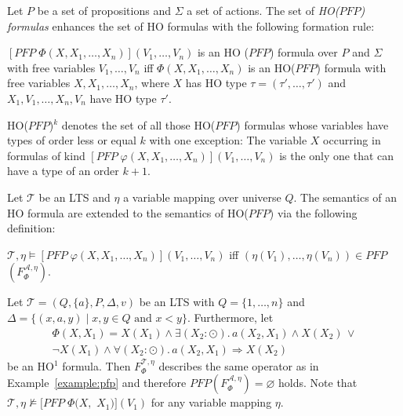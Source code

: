 \begin{definition}
    Let $P$ be a set of propositions and $\Sigma$ a set of actions. The set of \emph{HO($\mathit{PFP}$) formulas} enhances the set of HO formulas with the
    following formation rule:
    \begin{compactitem}
        \item $[\mathit{PFP}\;\Phi(X, X_1, \dots, X_n)](V_1, \dots, V_n)$ is an HO
        ($\mathit{PFP}$) formula over $P$ and $\Sigma$ with free variables $V_1, \dots, V_n$ iff $\Phi(X, X_1, \dots, X_n)
        $ is an HO($\mathit{PFP}$) formula with free variables $X, X_1, \dots, X_n$, where $X$ has HO type $\tau =
        (\tau', \dots, \tau')$ and $X_1, V_1, \dots, X_n, V_n$ have HO type $\tau'$.
    \end{compactitem}
\end{definition}

HO($\mathit{PFP}$)$^k$ denotes the set of all those HO($\mathit{PFP}$) formulas whose variables have types of
order less or equal $k$ with one exception: The variable $X$ occurring in formulas of kind $[\mathit{PFP}\;\varphi(X, X_1, \dots, X_n)](V_1, \dots, V_n)$ is the only one that can have a type of an order $k+1$.

\begin{definition}
    Let $\mathcal{T}$ be an LTS and $\eta$ a variable mapping over universe $Q$. The
    semantics of an HO formula are extended to the semantics of HO($\mathit{PFP}$) via the following definition:
    \begin{compactitem}
        \item $\mathcal{T}, \eta \models [\mathit{PFP}\;\varphi(X, X_1, \dots, X_n)](V_1, \dots,
        V_n)$ iff $(\eta(V_1), \dots, \eta(V_n)) \in \mathit{PFP}$ $(F_\Phi^{\mathcal{A},\eta})$.
    \end{compactitem}
\end{definition}

\begin{example}
\label{example:ho_pfp}
Let $\mathcal{T} = (Q, \{a\}, P, \Delta, v)$ be an LTS with $Q = \{1, \dots, n\}$ and $\Delta = \{(x, a, y) \mid x, y \in Q \text{ and } x < y\}$. Furthermore, let
\begin{align*}
	\Phi(X,X_1) = X(X_1) \wedge \exists (X_2 \colon \odot).\, a(X_2, X_1) \wedge X(X_2)\,\vee \\ 
	\neg X(X_1) \wedge \forall (X_2 \colon \odot).\, a(X_2, X_1) \Rightarrow X(X_2)
\end{align*}
be an HO$^1$ formula. Then $F_\Phi^{\mathcal{T}, \eta}$ describes the same operator as in Example~\ref{example:pfp} and therefore $PFP(F_\Phi^{\mathcal{A},\eta}) = \varnothing$ holds. Note that $\mathcal{T}, \eta \not\models [PFP\; \Phi(X, $ $X_1)](V_1)$ for any variable mapping $\eta$.
\end{example}